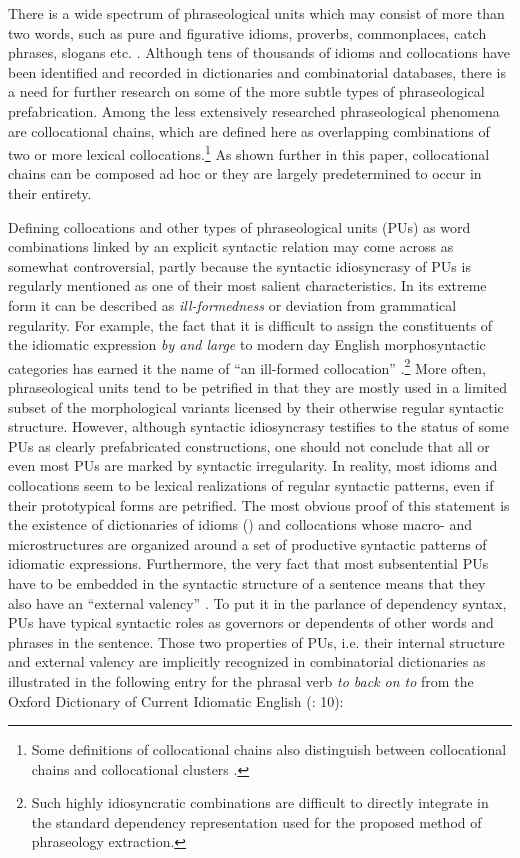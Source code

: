 \documentclass[output=paper]{langscibook}
\begin{document}
There is a wide spectrum of phraseological units which may consist of more than two words, such as pure and figurative idioms, proverbs, commonplaces, catch phrases, slogans etc. \citep{Cowie1998}. Although tens of thousands of idioms and collocations have been identified and recorded in dictionaries and combinatorial databases, there is a need for further research on some of the more subtle types of phraseological prefabrication. Among the less extensively researched phraseological phenomena are collocational chains, which are defined here as overlapping combinations of two or more lexical collocations.\footnote{Some definitions of collocational chains also distinguish between collocational chains and collocational clusters \citep{Hausmann2004,HeidGouws2006}.} As shown further in this paper, collocational chains can be composed ad hoc or they are largely predetermined to occur in their entirety.

Defining collocations and other types of phraseological units (PUs) as word combinations linked by an explicit syntactic relation may come across as somewhat controversial, partly because the syntactic idiosyncrasy of PUs is regularly mentioned as one of their most salient characteristics. In its extreme form it can be described as \textit{ill-formedness} or deviation from grammatical regularity. For example, the fact that it is difficult to assign the constituents of the idiomatic expression \textit{by and large} to modern day English morphosyntactic categories has earned it the name of ``an ill-formed collocation'' \citep{Moon1998}.\footnote{Such highly idiosyncratic combinations are difficult to directly integrate in the standard dependency representation used for the proposed method of phraseology extraction.}  More often, phraseological units tend to be petrified in that they are mostly used in a limited subset of the morphological variants licensed by their otherwise regular syntactic structure. However, although syntactic idiosyncrasy testifies to the status of some PUs as clearly prefabricated constructions, one should not conclude that all or even most PUs are marked by syntactic irregularity. In reality, most idioms and collocations seem to be lexical realizations of regular syntactic patterns, even if their prototypical forms are petrified. The most obvious proof of this statement is the existence of dictionaries of idioms (\citealt{CowieMackin1975,CowieEtAl1993}) and collocations \citep{CrowtherEtAl2003} whose macro- and microstructures are organized around a set of productive syntactic patterns of idiomatic expressions. Furthermore, the very fact that most subsentential PUs have to be embedded in the syntactic structure of a sentence means that they also have an ``external valency'' \citep{Burger2003}. To put it in the parlance of dependency syntax, PUs have typical syntactic roles as governors or dependents of other words and phrases in the sentence. Those two properties of PUs, i.e. their internal structure and external valency are implicitly recognized in combinatorial dictionaries as illustrated in the following entry for the phrasal verb \textit{to back on to} from the Oxford Dictionary of Current Idiomatic English (\citealt{CowieMackin1975}: 10):
\end{document}
